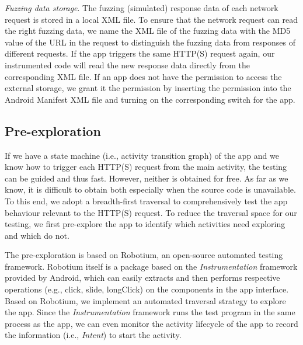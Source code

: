 \documentclass[sigconf,review, anonymous]{acmart}
\begin{document}
\textit{Fuzzing data storage}. The fuzzing (simulated) response data of each network request is stored in a local XML file. To ensure that the network request can read the right fuzzing data, we name the XML file of the fuzzing data with the MD5 value of the URL in the request to distinguish the fuzzing data from responses of different requests. If the app triggers the same HTTP(S) request again, our instrumented code will read the new response data directly from the corresponding XML file. If an app does not have the permission to access the external storage, we grant it the permission by inserting the permission into the Android Manifest XML file and turning on the corresponding switch for the app.
 



\subsection{Pre-exploration}\label{sub_pre}
If we have a state machine (i.e., activity transition graph) of the app and we know how to trigger each HTTP(S) request from the main activity, the testing can be guided and thus fast. However, neither is obtained for free. As far as we know, it is difficult to obtain both especially when the source code is unavailable. 
To this end, we adopt a breadth-first traversal to comprehensively test the app behaviour relevant to the HTTP(S) request. To reduce the traversal space for our testing, we first pre-explore the app to identify which activities need exploring and which do not. 

The pre-exploration is based on \textsf{Robotium}, an open-source automated testing framework. \textsf{Robotium} itself is a package based on the \textit{Instrumentation} framework provided by Android, which can easily extracts and then performs respective operations (e.g., click, slide, longClick) on the components in the app interface. Based on \textsf{Robotium}, we implement an automated traversal strategy to explore the app. Since the \textit{Instrumentation} framework runs the test program in the same process as the app, we can even monitor the activity lifecycle of the app to record the information (i.e.,  \textit{Intent}) to start the activity. 
\end{document}

